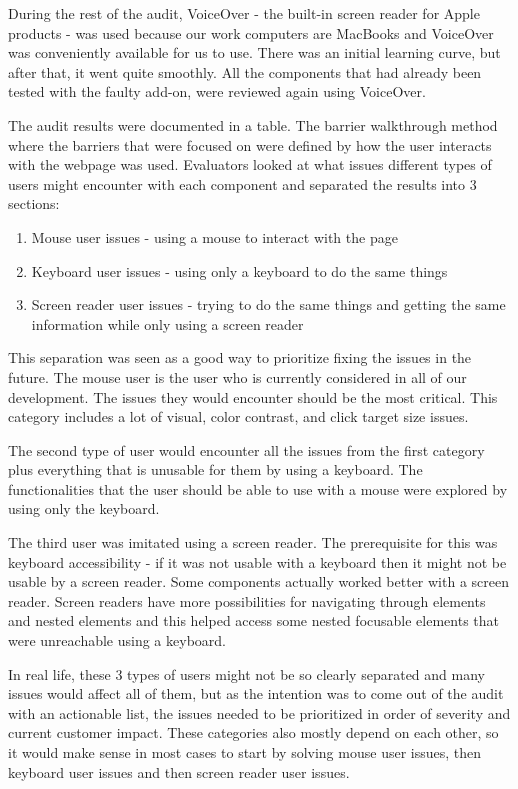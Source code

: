 \documentclass{master_thesis}
\begin{document}
During the rest of the audit, VoiceOver - the built-in screen reader for Apple products - was used because our work computers are MacBooks and VoiceOver was conveniently available for us to use. There was an initial learning curve, but after that, it went quite smoothly. All the components that had already been tested with the faulty add-on, were reviewed again using VoiceOver.

The audit results were documented in a table. The barrier walkthrough method where the barriers that were focused on were defined by how the user interacts with the webpage was used. Evaluators looked at what issues different types of users might encounter with each component and separated the results into 3 sections:
\begin{enumerate}
	\item Mouse user issues - using a mouse to interact with the page
	\item Keyboard user issues - using only a keyboard to do the same things
	\item Screen reader user issues - trying to do the same things and getting the same information while only using a screen reader
\end{enumerate}

This separation was seen as a good way to prioritize fixing the issues in the future. The mouse user is the user who is currently considered in all of our development. The issues they would encounter should be the most critical. This category includes a lot of visual, color contrast, and click target size issues.

The second type of user would encounter all the issues from the first category plus everything that is unusable for them by using a keyboard. The functionalities that the user should be able to use with a mouse were explored by using only the keyboard.

The third user was imitated using a screen reader. The prerequisite for this was keyboard accessibility - if it was not usable with a keyboard then it might not be usable by a screen reader. Some components actually worked better with a screen reader. Screen readers have more possibilities for navigating through elements and nested elements and this helped access some nested focusable elements that were unreachable using a keyboard.

In real life, these 3 types of users might not be so clearly separated and many issues would affect all of them, but as the intention was to come out of the audit with an actionable list, the issues needed to be prioritized in order of severity and current customer impact. These categories also mostly depend on each other, so it would make sense in most cases to start by solving mouse user issues, then keyboard user issues and then screen reader user issues.
\end{document}
